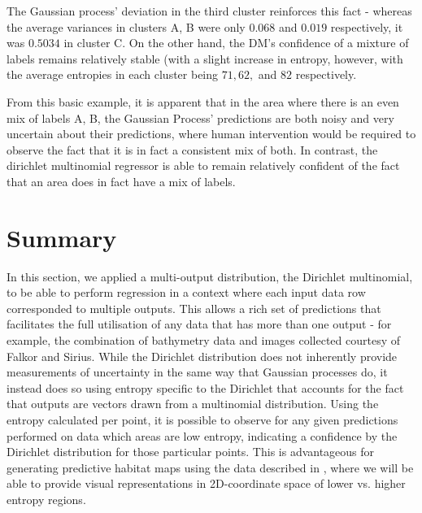 The Gaussian process' deviation in the third cluster reinforces this fact - whereas the average variances in clusters A, B were only $0.068$ and $0.019$ respectively, it was $0.5034$ in cluster C. On the other hand, the DM's confidence of a mixture of labels remains relatively stable (with a slight increase in entropy, however, with the average entropies in each cluster being $71, 62,$ and $82$ respectively.


From this basic example, it is apparent that in the area where there is an even mix of labels A, B, the Gaussian Process' predictions are both noisy and very uncertain about their predictions, where human intervention would be required to observe the fact that it is in fact a consistent mix of both. In contrast, the dirichlet multinomial regressor is able to remain relatively confident of the fact that an area does in fact have a mix of labels.

\section{Summary}

In this section, we applied a multi-output distribution, the Dirichlet multinomial, to be able to perform regression in a context where each input data row corresponded to multiple outputs. This allows a rich set of predictions that facilitates the full utilisation of any data that has more than one output - for example, the combination of bathymetry data and images collected courtesy of Falkor and Sirius. While the Dirichlet distribution does not inherently provide measurements of uncertainty in the same way that Gaussian processes do, it instead does so using entropy specific to the Dirichlet that accounts for the fact that outputs are vectors drawn from a multinomial distribution. Using the entropy calculated per point, it is possible to observe for any given predictions performed on data which areas are low entropy, indicating a confidence by the Dirichlet distribution for those particular points. This is advantageous  for generating predictive habitat maps using the data described in , where we will be able to provide visual representations in 2D-coordinate space of lower vs. higher entropy regions.
